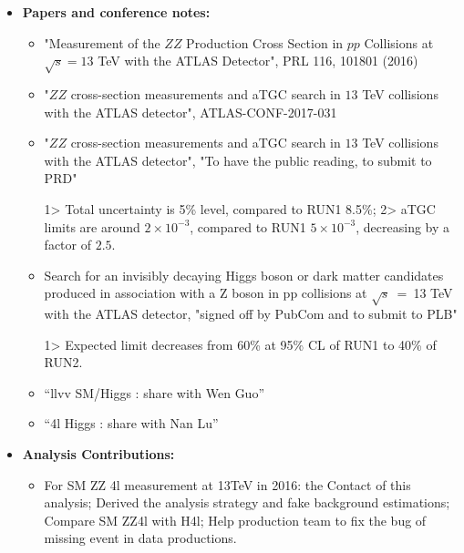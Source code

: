 \begin{itemize}

\item \textbf{Papers and conference notes:}

    \begin{itemize}
       
      \item "Measurement of the $ZZ$ Production Cross Section in $pp$ Collisions at $\sqrt{s}=13$ TeV 
            with the ATLAS Detector", PRL 116, 101801 (2016)~\cite{atlas_run2_SM_ZZ4l_2016}

      \item "$ZZ$ cross-section measurements and aTGC search in $13$ TeV collisions with the ATLAS detector",
            ATLAS-CONF-2017-031~\cite{atlas_run2_SM_ZZ4l_2017}

      \item "$ZZ$ cross-section measurements and aTGC search in $13$ TeV collisions with the ATLAS detector",
            "To have the public reading, to submit to PRD"

            1> Total uncertainty is 5\% level, compared to RUN1 8.5\%; 2> aTGC limits are around $2\times10^{-3}$,
            compared to RUN1 $5\times10^{-3}$, decreasing by a factor of $2.5$.

      \item Search for an invisibly decaying Higgs boson or dark matter candidates produced in association with a 
            Z boson in pp collisions at $\sqrt{s}$~=~13 TeV with the ATLAS detector, "signed off by PubCom and to submit to 
            PLB" 

            1> Expected limit decreases from 60\% at 95\% CL of RUN1 to 40\% of RUN2.

      \item ``llvv SM/Higgs : share with Wen Guo''

      \item ``4l Higgs : share with Nan Lu''

    \end{itemize}

\item \textbf{Analysis Contributions:}

    \begin{itemize}
      \item For SM ZZ 4l measurement at 13TeV in 2016: the Contact of this analysis; Derived the analysis strategy and 
       fake background estimations; Compare SM ZZ4l with H4l; Help production team to fix the bug of missing event
       in data productions.


\end{itemize}
\end{itemize}
